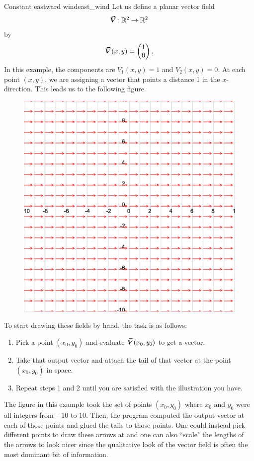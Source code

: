                 \begin{ex}{Constant eastward wind}{east_wind}
                Let us define a planar vector field
                \[
                \boldsymbol{\vec{V}}\colon \mathbb{R}^2 \to \mathbb{R}^2
                \]
                by
                \[
                \boldsymbol{\vec{V}}(x,y)=\begin{pmatrix} 1 \\ 0 \end{pmatrix}.
                \]
                In this example, the components are $V_1(x,y)=1$ and $V_2(x,y)=0$. At each point $(x,y)$, we are assigning a vector that points a distance 1 in the $x$-direction. This leads us to the following figure.
                \begin{figure}[H]
                    \centering
                    \includegraphics[width=.6\textwidth]{Figures_Part_6/wind_field.png}
                \end{figure}

                To start drawing these fields by hand, the task is as follows:
                \begin{enumerate}[1.]
                    \item Pick a point $(x_0,y_0)$ and evaluate $\boldsymbol{\vec{V}}(x_0,y_0)$ to get a vector. 
                    \item Take that output vector and attach the tail of that vector at the point $(x_0,y_0)$ in space.
                    \item Repeat steps 1 and 2 until you are satisfied with the illustration you have.
                \end{enumerate}

                The figure in this example took the set of points $(x_0,y_0)$ where $x_0$ and $y_0$ were all integers from $-10$ to $10$. Then, the program computed the output vector at each of those points and glued the tails to those points. One could instead pick different points to draw these arrows at and one can also ``scale" the lengths of the arrows to look nicer since the qualitative look of the vector field is often the most dominant bit of information.
                \end{ex}

